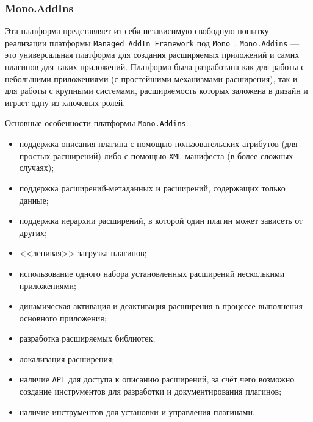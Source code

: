 \subsubsection{Mono.AddIns}

Эта платформа представляет из себя независимую свободную попытку реализации платформы {\tt Managed AddIn Framework} под {\tt Mono}~\cite{mono-addins-website}.
{\tt Mono.Addins} --- это универсальная платформа для создания расширяемых приложений и самих плагинов для таких приложений. Платформа была разработана  как для работы с небольшими приложениями (с простейшими механизмами расширения), так и для работы с крупными системами, расширяемость которых заложена в дизайн и играет одну из ключевых ролей.

Основные особенности платформы {\tt Mono.Addins}:
\begin{itemize}
  \item поддержка описания плагина с помощью пользовательских атрибутов (для простых расширений) либо с помощью {\tt XML}-манифеста (в более сложных случаях);
  \item поддержка расширений-метаданных и расширений, содержащих только данные;
  \item поддержка иерархии расширений, в которой один плагин может зависеть от других;
  \item <<ленивая>> загрузка плагинов;
  \item использование одного набора установленных расширений несколькими приложениями;
  \item динамическая активация и деактивация расширения в процессе выполнения основного приложения;
  \item разработка расширяемых библиотек;
  \item локализация расширения;
  \item наличие {\tt API} для доступа к описанию расширений, за счёт чего возможно создание инструментов для разработки и документирования плагинов;
  \item наличие инструментов для установки и управления плагинами.
\end{itemize}
